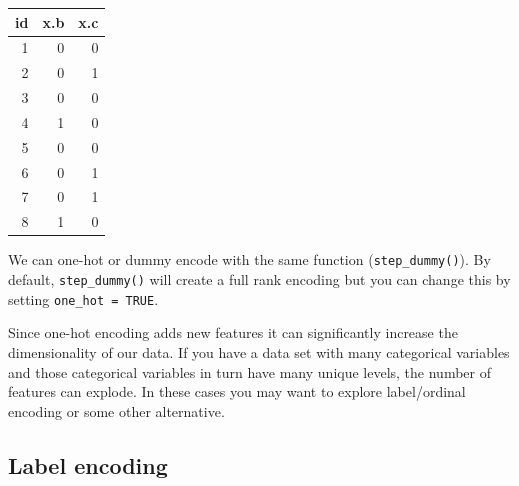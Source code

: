 \documentclass[]{krantz}
\makeatletter
\newenvironment{Shaded}{\begin{snugshade}}{\end{snugshade}}
\newcommand{\CommentTok}[1]{\textcolor[rgb]{0.37,0.37,0.37}{\textit{#1}}}
\newcommand{\DataTypeTok}[1]{\textcolor[rgb]{0.27,0.27,0.27}{#1}}
\newcommand{\KeywordTok}[1]{\textcolor[rgb]{0.27,0.27,0.27}{\textbf{#1}}}
\newcommand{\NormalTok}[1]{#1}
\newcommand{\OperatorTok}[1]{\textcolor[rgb]{0.43,0.43,0.43}{\textbf{#1}}}
\newcommand{\OtherTok}[1]{\textcolor[rgb]{0.37,0.37,0.37}{#1}}
\newcommand{\StringTok}[1]{\textcolor[rgb]{0.5,0.5,0.5}{#1}}
\newenvironment{kframe}{%
\medskip{}
\setlength{\fboxsep}{.8em}
 \def\at@end@of@kframe{}%
 \ifinner\ifhmode%
  \def\at@end@of@kframe{\end{minipage}}%
  \begin{minipage}{\columnwidth}%
 \fi\fi%
 \def\FrameCommand##1{\hskip\@totalleftmargin \hskip-\fboxsep
 \colorbox{shadecolor}{##1}\hskip-\fboxsep
     \hskip-\linewidth \hskip-\@totalleftmargin \hskip\columnwidth}%
 \MakeFramed {\advance\hsize-\width
   \@totalleftmargin\z@ \linewidth\hsize
   \@setminipage}}%
 {\par\unskip\endMakeFramed%
 \at@end@of@kframe}
\newenvironment{block}[1]
  {
  \begin{itemize}
  \renewcommand{\labelitemi}{
    \raisebox{-.7\height}[0pt][0pt]{
      {\setkeys{Gin}{width=3em,keepaspectratio}\texttt{[image: icons/\#1]}}
    }
  }
  \setlength{\fboxsep}{1em}
  \begin{kframe}
  \item
  }
  {
  \end{kframe}
  \end{itemize}
  }
\newenvironment{tip}
  {\begin{block}{tip}}
  {\end{block}}
\renewenvironment{Shaded}{\begin{kframe}}{\end{kframe}}
\makeatother
\begin{document}
\begin{tabular}{r|r|r}
\hline
id & x.b & x.c\\
\hline
1 & 0 & 0\\
\hline
2 & 0 & 1\\
\hline
3 & 0 & 0\\
\hline
4 & 1 & 0\\
\hline
5 & 0 & 0\\
\hline
6 & 0 & 1\\
\hline
7 & 0 & 1\\
\hline
8 & 1 & 0\\
\hline
\end{tabular}

We can one-hot or dummy encode with the same function (\texttt{step\_dummy()}). By default, \texttt{step\_dummy()} will create a full rank encoding but you can change this by setting \texttt{one\_hot\ =\ TRUE}.

\begin{Shaded}
\end{Shaded}

\begin{tip}
Since one-hot encoding adds new features it can significantly increase
the dimensionality of our data. If you have a data set with many
categorical variables and those categorical variables in turn have many
unique levels, the number of features can explode. In these cases you
may want to explore label/ordinal encoding or some other alternative.
\end{tip}

\hypertarget{label-encoding}{%
\subsection{Label encoding}\label{label-encoding}}
\end{document}
